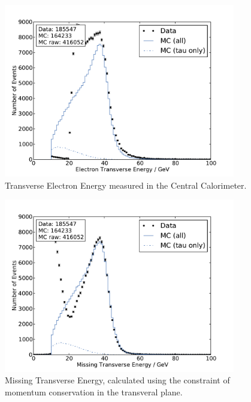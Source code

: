 \documentclass[
	paper=A4,
	parskip=full,
	chapterprefix=true,
	11pt,
	headings=normal,
	bibliography=totoc,
	listof=totoc,
	titlepage=on,
]{scrreprt}
\begin{document}
\begin{figure}[htbp]
	\centering
	\includegraphics[width=0.9\textwidth]{nocuts/E_T_el}
	\caption{Transverse Electron Energy measured in the Central Calorimeter.}
	\label{fig:no_cuts_Et}
\end{figure}
\begin{figure}[htbp]
	\centering
	\includegraphics[width=0.9\textwidth]{nocuts/E_T_miss}
	\caption{Missing Transverse Energy, calculated using the constraint of momentum conservation in the transveral plane.}
	\label{fig:no_cuts_met}
\end{figure}
\end{document}
